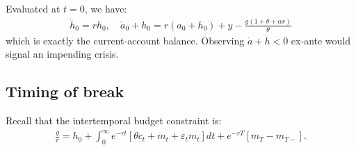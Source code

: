\documentclass[a4paper,12pt]{article} %
\theoremstyle{nonitalic}
\begin{document}
Evaluated at $t=0$, we have:
\begin{gather*}
    \dot{h}_0 = r h_ 0, \quad \dot{a}_0 + \dot{h}_0 = r (a_0 + h_0) + y - \frac{g (1 + \theta + \alpha r)}{\theta}
\end{gather*}
which is exactly the current-account balance. Observing $\dot{a} + \dot{h} < 0$ ex-ante would signal an impending crisis.


\subsection{Timing of break}\label{sec:1.5}
Recall that the intertemporal budget constraint is:
\begin{gather*}
    \frac{g}{r} = h_0 + \int_0^{\infty} e^{-rt} \left[  \theta c_t + \dot{m}_t + \varepsilon_t m_t \right] dt + e^{-rT} \left[ m_T - m_{T-} \right].
\end{gather*}
\end{document}
